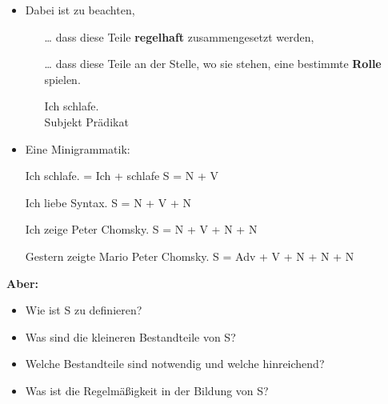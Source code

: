 \begin{frame}

\begin{itemize}
\item Dabei ist zu beachten, 

\begin{itemize}

	\item [\dots] dass diese Teile \textbf{regelhaft} zusammengesetzt werden,

	\eal 
	\zl

\pause

	\item [\dots] dass diese Teile an der Stelle, wo sie stehen, eine bestimmte \textbf{Rolle} spielen.
			
	\ea
	\gll Ich schlafe.\\
	Subjekt Prädikat\\
	\z
	
\end{itemize}

\end{itemize}

\end{frame}


\begin{frame}

\begin{itemize}
	\item Eine Minigrammatik:

	\eal 
	\ex Ich schlafe. = Ich + schlafe
\pause	
	\ex	S = N + V 
	\zl

\pause
	
	\eal 
	\ex Ich liebe Syntax.
\pause
	\ex S = N + V + N
	\zl

\pause
		
	\eal 
	\ex Ich zeige Peter Chomsky.
\pause
	\ex S = N + V + N + N 
	\zl
	
\pause
	
	\eal 
	\ex Gestern zeigte Mario Peter Chomsky.
\pause
	\ex S = Adv + V + N + N + N 
	\zl

\end{itemize}

\end{frame}


\begin{frame}

\textbf{Aber: }
	\begin{itemize}
		\item Wie ist S zu definieren?
		\item Was sind die kleineren Bestandteile von S?
		\item Welche Bestandteile sind notwendig und welche hinreichend?
		\item Was ist die Regelmäßigkeit in der Bildung von S?
	\end{itemize}	 	

\end{frame}

